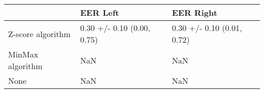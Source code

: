 \begin{tabular}{lll}
\toprule
{} &                    EER Left &                   EER Right \\
\midrule
Z-score algorithm &  0.30 +/- 0.10 (0.00, 0.75) &  0.30 +/- 0.10 (0.01, 0.72) \\
MinMax algorithm  &                         NaN &                         NaN \\
None              &                         NaN &                         NaN \\
\bottomrule
\end{tabular}
